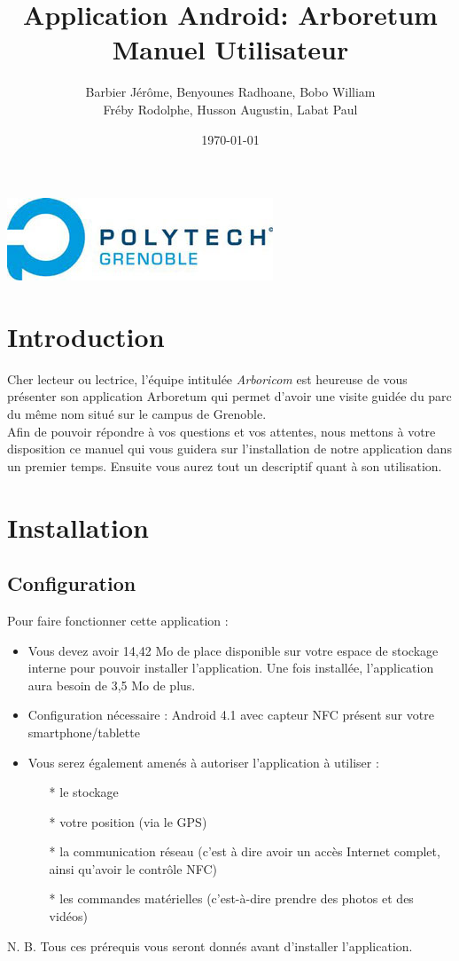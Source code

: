 \documentclass[a4paper,11pt]{article}
\title{Application Android: Arboretum\\
Manuel Utilisateur}
\author{Barbier Jérôme, Benyounes Radhoane, Bobo William\\ Fréby Rodolphe, Husson Augustin, Labat Paul}
\date{\today}
\begin{document}
  \maketitle

  \begin{center}
    \includegraphics{logoPol.jpg}\\
  \end{center}
  \tableofcontents
  \newpage
  
  \section{Introduction}
    Cher lecteur ou lectrice, l'équipe intitulée \textit{Arboricom} est heureuse de vous présenter son application Arboretum qui permet d'avoir une visite 
    guidée du parc du même nom situé sur le campus de Grenoble. \\
    Afin de pouvoir répondre à vos questions et vos attentes, nous mettons à votre disposition ce manuel qui vous guidera sur l'installation de
    notre application dans un premier temps. Ensuite vous aurez tout un descriptif quant à son utilisation.
  \section{Installation}
    \subsection{Configuration}
    Pour faire fonctionner cette application : 
    \begin{itemize}
     \item Vous devez avoir 14,42 Mo de place disponible sur votre espace de stockage interne pour pouvoir installer l'application. Une fois installée, l'application aura besoin de 3,5 Mo de plus.
     \item Configuration nécessaire : Android 4.1 avec capteur NFC présent sur votre smartphone/tablette
     \item Vous serez également amenés à autoriser l'application à utiliser : 
     \begin{itemize}
      \item[*] le stockage
      \item[*] votre position (via le GPS)
      \item[*] la communication réseau (c'est à dire avoir un accès Internet complet, ainsi qu'avoir le contrôle NFC)
      \item[*] les commandes matérielles (c'est-à-dire prendre des photos et des vidéos)
     \end{itemize}
    \end{itemize}
N. B. Tous ces prérequis vous seront donnés avant d'installer l'application.
\end{document}
